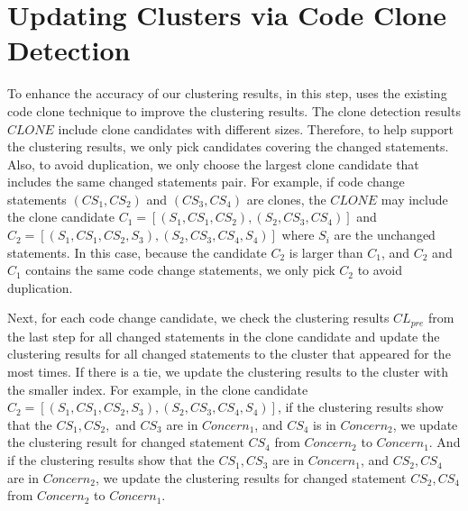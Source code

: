 \section{Updating Clusters via Code Clone Detection}

To enhance the accuracy of our clustering results, in this step, \tool uses the existing code clone technique \cite{svajlenko2017fast} to improve the clustering results. The clone detection results $CLONE$ include clone candidates with different sizes. Therefore, to help support the clustering results, we only pick candidates covering the changed statements. Also, to avoid duplication, we only choose the largest clone candidate that includes the same changed statements pair. For example, if code change statements $(CS_1, CS_2)$ and $(CS_3, CS_4)$ are clones, the $CLONE$ may include the clone candidate $C_1 = [(S_1, CS_1, CS_2), (S_2, CS_3, CS_4)]$ and $C_2= [(S_1, CS_1, CS_2, S_3), (S_2, CS_3, CS_4, S_4)]$ where $S_i$ are the unchanged statements. In this case, because the candidate $C_2$ is larger than $C_1$, and $C_2$ and $C_1$ contains the same code change statements, we only pick $C_2$ to avoid duplication. 

Next, for each code change candidate, we check the clustering results $CL_{pre}$ from the last step for all changed statements in the clone candidate and update the clustering results for all changed statements to the cluster that appeared for the most times. If there is a tie, we update the clustering results to the cluster with the smaller index. For example, in the clone candidate $C_2= [(S_1, CS_1, CS_2, S_3), (S_2, CS_3, CS_4, S_4)]$, if the clustering results show that the $CS_1, CS_2,$ and $CS_3$ are in $Concern_1$, and $CS_4$ is in $Concern_2$, we update the clustering result for changed statement $CS_4$ from $Concern_2$ to $Concern_1$. And if the clustering results show that the $CS_1, CS_3$ are in $Concern_1$, and $CS_2, CS_4$ are in $Concern_2$, we update the clustering results for changed statement $CS_2, CS_4$ from $Concern_2$ to $Concern_1$.



 

